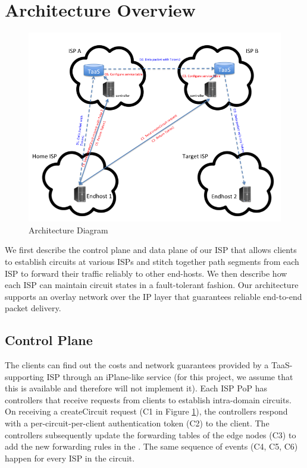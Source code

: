 \documentclass{article}
\begin{document}
\section{Architecture Overview}
\begin{figure}
\includegraphics[width=\linewidth]{diagram}
\caption{Architecture Diagram}
\label{fig:diagram}
\end{figure}

We first describe the control plane and data plane of our ISP that
allows clients to establish circuits at various ISPs and stitch
together path segments from each ISP to forward their traffic reliably
to other end-hosts. We then describe how each ISP can maintain circuit
states in a fault-tolerant fashion. Our architecture supports an
overlay network over the IP layer that guarantees reliable end-to-end
packet delivery.

\subsection{Control Plane}

The clients can find out the costs and network guarantees provided by
a TaaS-supporting ISP through an iPlane-like service (for this
project, we assume that this is available and therefore will not
implement it). Each ISP PoP has controllers that receive requests from
clients to establish intra-domain circuits. On receiving a
createCircuit request (C1 in Figure \ref{fig:diagram}), the
controllers respond with a per-circuit-per-client authentication token
(C2) to the client. The controllers subsequently update the forwarding
tables of the edge nodes (C3) to add the new forwarding rules in the .
The same sequence of events (C4, C5, C6) happen for every ISP in the
circuit.
\end{document}
